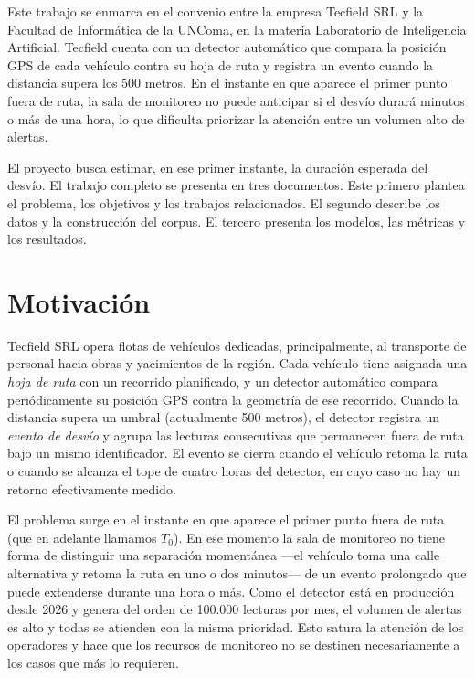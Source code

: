 \documentclass[12pt, a4paper]{article}
\begin{document}
Este trabajo se enmarca en el convenio entre la empresa Tecfield SRL y la Facultad de Informática de
la UNComa, en la materia Laboratorio de Inteligencia Artificial. Tecfield cuenta con un detector
automático que compara la posición GPS de cada vehículo contra su hoja de ruta y registra un evento
cuando la distancia supera los 500 metros. En el instante en que aparece el primer punto fuera de
ruta, la sala de monitoreo no puede anticipar si el desvío durará minutos o más de una hora, lo que
dificulta priorizar la atención entre un volumen alto de alertas.

El proyecto busca estimar, en ese primer instante, la duración esperada del desvío. El trabajo
completo se presenta en tres documentos. Este primero plantea el problema, los objetivos y los
trabajos relacionados. El segundo describe los datos y la construcción del corpus. El tercero
presenta los modelos, las métricas y los resultados.

\section{Motivación}

Tecfield SRL opera flotas de vehículos dedicadas, principalmente, al transporte
de personal hacia obras y yacimientos de la región. Cada vehículo tiene asignada
una \emph{hoja de ruta} con un recorrido planificado, y un detector automático
compara periódicamente su posición GPS contra la geometría de ese recorrido.
Cuando la distancia supera un umbral (actualmente 500 metros), el detector
registra un \emph{evento de desvío} y agrupa las lecturas consecutivas que
permanecen fuera de ruta bajo un mismo identificador. El evento se cierra cuando
el vehículo retoma la ruta o cuando se alcanza el tope de cuatro horas del
detector, en cuyo caso no hay un retorno efectivamente medido.

El problema surge en el instante en que aparece el primer punto fuera de ruta
(que en adelante llamamos $T_0$). En ese momento la sala de monitoreo no tiene
forma de distinguir una separación momentánea ---el vehículo toma una calle
alternativa y retoma la ruta en uno o dos minutos--- de un evento prolongado que
puede extenderse durante una hora o más. Como el detector está en producción
desde 2026 y genera del orden de 100.000 lecturas por mes, el volumen de
alertas es alto y todas se atienden con la misma prioridad. Esto satura la
atención de los operadores y hace que los recursos de monitoreo no se destinen
necesariamente a los casos que más lo requieren.
\end{document}
